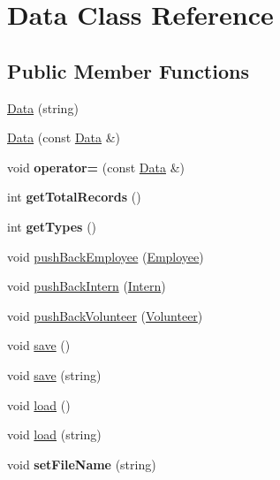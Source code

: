 \hypertarget{class_data}{\section{Data Class Reference}
\label{class_data}
}
\subsection*{Public Member Functions}
\begin{DoxyCompactItemize}
\item 
\hyperlink{class_data_a7e546a6e6e55f93cb621011dff413f00}{Data} (string)
\item 
\hyperlink{class_data_aa7a5bd3a55e7e04904169e19d2d8c260}{Data} (const \hyperlink{class_data}{Data} \&)
\item 
\hypertarget{class_data_a02affbc0f8564106c84dc59f34666912}{void {\bfseries operator=} (const \hyperlink{class_data}{Data} \&)}\label{class_data_a02affbc0f8564106c84dc59f34666912}

\item 
\hypertarget{class_data_a1284ad833afb89c134f6147ad3d3a215}{int {\bfseries get\+Total\+Records} ()}\label{class_data_a1284ad833afb89c134f6147ad3d3a215}

\item 
\hypertarget{class_data_aad28ab6c7b8aadcf5437cd5873a08249}{int {\bfseries get\+Types} ()}\label{class_data_aad28ab6c7b8aadcf5437cd5873a08249}

\item 
void \hyperlink{class_data_a084539a13d52301e80fe569881c65555}{push\+Back\+Employee} (\hyperlink{class_employee}{Employee})
\item 
void \hyperlink{class_data_a881e68d04aecd4505834b1c4539e5981}{push\+Back\+Intern} (\hyperlink{class_intern}{Intern})
\item 
void \hyperlink{class_data_ad1bbb5fb06c75075d3de92adf27cae54}{push\+Back\+Volunteer} (\hyperlink{class_volunteer}{Volunteer})
\item 
void \hyperlink{class_data_aca52d48d16907234db7a919d93d9d8d9}{save} ()
\item 
void \hyperlink{class_data_a499f605129a674f6c6f5f1ea75e9f470}{save} (string)
\item 
void \hyperlink{class_data_aca6c9aff290e9a97a26903bfe98bfc1c}{load} ()
\item 
void \hyperlink{class_data_af9c0e0daec7950ce639447995e836214}{load} (string)
\item 
\hypertarget{class_data_ae0765ecb02808624ec6c7fe871c88339}{void {\bfseries set\+File\+Name} (string)}\label{class_data_ae0765ecb02808624ec6c7fe871c88339}


\end{DoxyCompactItemize}
